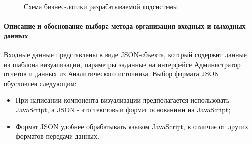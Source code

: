 \documentclass[a4paper]{extarticle}
\numberwithin{equation}{section}
\begin{document}
\begin{figure}[H]
\centering
\caption{Схема бизнес-логики разрабатываемой подсистемы}
\label{ris2}
\end{figure}\par

\paragraph{Описание и обоснование выбора метода организация входных и выходных данных}
Входные данные представлены в виде JSON-объекта, который содержит данные из шаблона визуализации, параметры заданные на интерфейсе Администратор отчетов и данных из Аналитического источника. Выбор формата JSON обусловлен следующим:
\begin{itemize}
\item При написании компонента визуализации предполагается использовать JavaScript, а JSON - это текстовый формат основанный на JavaScript;
\item Формат JSON удобнее обрабатывать языком JavaScript, в отличие от других форматов передачи данных.
\end{itemize}
\end{document}
